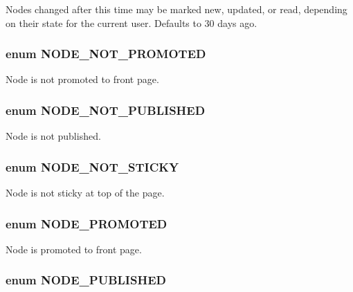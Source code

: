 Nodes changed after this time may be marked new, updated, or read, depending on their state for the current user. Defaults to 30 days ago. \hypertarget{node_8module_a779cdc67f5fc4ef57fed00293067f4a7}{
\subsubsection[{NODE\_\-NOT\_\-PROMOTED}]{\setlength{\rightskip}{0pt plus 5cm}enum {\bf NODE\_\-NOT\_\-PROMOTED}}}
\label{node_8module_a779cdc67f5fc4ef57fed00293067f4a7}
Node is not promoted to front page. \hypertarget{node_8module_ae89cd87cdf9fef403c8c5df93de39672}{
\subsubsection[{NODE\_\-NOT\_\-PUBLISHED}]{\setlength{\rightskip}{0pt plus 5cm}enum {\bf NODE\_\-NOT\_\-PUBLISHED}}}
\label{node_8module_ae89cd87cdf9fef403c8c5df93de39672}
Node is not published. \hypertarget{node_8module_a400a6e3960e60cc27d070d1dd123c9e4}{
\subsubsection[{NODE\_\-NOT\_\-STICKY}]{\setlength{\rightskip}{0pt plus 5cm}enum {\bf NODE\_\-NOT\_\-STICKY}}}
\label{node_8module_a400a6e3960e60cc27d070d1dd123c9e4}
Node is not sticky at top of the page. \hypertarget{node_8module_aa19bda5cfea2bba531f2bb461c71b72f}{
\subsubsection[{NODE\_\-PROMOTED}]{\setlength{\rightskip}{0pt plus 5cm}enum {\bf NODE\_\-PROMOTED}}}
\label{node_8module_aa19bda5cfea2bba531f2bb461c71b72f}
Node is promoted to front page. \hypertarget{node_8module_a59b1bca644d4464345020a98baef8824}{
\subsubsection[{NODE\_\-PUBLISHED}]{\setlength{\rightskip}{0pt plus 5cm}enum {\bf NODE\_\-PUBLISHED}}}
